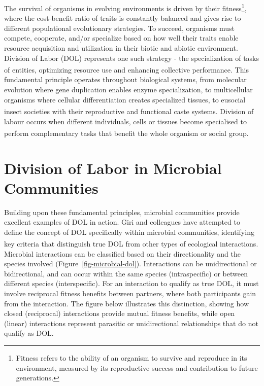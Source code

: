\documentclass[
  11pt,
  a4paper,
]{report}
\begin{document}
The survival of organisms in evolving environments is driven by their
fitness\footnote{Fitness refers to the ability of an organism to survive
  and reproduce in its environment, measured by its reproductive success
  and contribution to future generations.}, where the cost-benefit ratio
of traits is constantly balanced and gives rise to different
populational evolutionary strategies. To succeed, organisms must
compete, cooperate, and/or specialize based on how well their traits
enable resource acquisition and utilization in their biotic and abiotic
environment. Division of Labor (DOL) represents one such strategy - the
specialization of tasks of entities, optimizing resource use and
enhancing collective
performance\textsuperscript{}. This
fundamental principle operates throughout biological systems, from
molecular evolution where gene duplication enables enzyme
specialization, to multicellular organisms where cellular
differentiation creates specialized tissues, to eusocial insect
societies with their reproductive and functional caste
systems\textsuperscript{}. Division of labour
occurs when different individuals, cells or tissues become specialised
to perform complementary tasks that benefit the whole organism or social
group\textsuperscript{}.

\section{Division of Labor in Microbial
Communities}\label{division-of-labor-in-microbial-communities}

Building upon these fundamental principles, microbial communities
provide excellent examples of DOL in action. Giri and colleagues have
attempted to define the concept of DOL specifically within microbial
communities, identifying key criteria that distinguish true DOL from
other types of ecological
interactions\textsuperscript{}. Microbial
interactions can be classified based on their directionality and the
species involved (Figure~\ref{fig-microbial-dol}). Interactions can be
unidirectional or bidirectional, and can occur within the same species
(intraspecific) or between different species (interspecific). For an
interaction to qualify as true DOL, it must involve reciprocal fitness
benefits between partners, where both participants gain from the
interaction. The figure below illustrates this distinction, showing how
closed (reciprocal) interactions provide mutual fitness benefits, while
open (linear) interactions represent parasitic or unidirectional
relationships that do not qualify as DOL.
\end{document}
